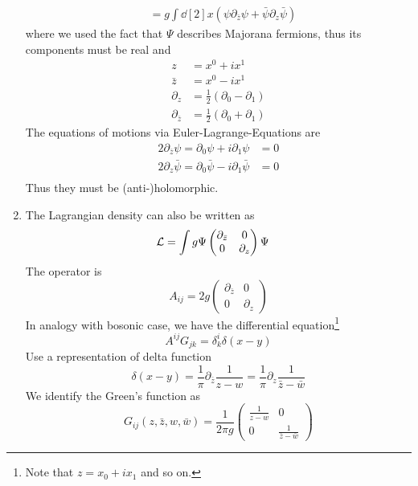 \begin{enumerate}[label=(\alph*)]
\begin{align*}
				 &= g \int \dd[2]{x} \left( {\psi} \partial_{\bar{z}} \psi + \bar{\psi} \partial_z \bar{\psi} \right)
		\end{align*}
		where we used the fact that $\Psi$ describes Majorana fermions, thus its components must be real and
		\begin{align*}
			z &= x^0+ix^1 \\
			\bar{z} &= x^0 - ix^1  \\
			\partial_z &= \frac{1}{2} \left( \partial_0 - \partial_1 \right) \\
			\partial_{\bar{z}} &= \frac{1}{2} \left( \partial_0 + \partial_1 \right)
		\end{align*}
		The equations of motions via Euler-Lagrange-Equations are
		\begin{align*}
			2\partial_{\bar{z}} \psi = \partial_0\psi + i \partial_1 \psi &=0	 \\
			2\partial_{z} \bar\psi = \partial_0 \bar\psi - i \partial_1 \bar\psi &=0	 \\
		\end{align*}
		Thus they must be (anti-)holomorphic.

	\item The Lagrangian density can also be written as
		\begin{align*}
			\mathcal{L} &= \int  g \Psi \begin{pmatrix} \partial_{\bar{z}} & 0  \\ 0 & \partial_{z}  \end{pmatrix} \Psi 
		\end{align*}
		The operator is
		\begin{equation}
			A_{ij} = 2g \begin{pmatrix} \partial_{\bar{z}} & 0 \\ 0 & \partial_z \end{pmatrix} 
		\end{equation}
		In analogy with bosonic case, we have the differential equation\footnote{Note that $z=x_0 + ix_1$ and so on.}
		\begin{equation}
			A^{ij} G_{jk} = \delta^{i}_{k} \delta(x-y)
		\end{equation}
		Use a representation of delta function
		\begin{equation*}
			\delta(x-y) = \frac{1}{\pi} \partial_{\bar{z}} \frac{1}{z-w} = \frac{1}{\pi} \partial_{z} \frac{1}{\bar{z}-\bar{w}}
		\end{equation*}
		We identify the Green's function as
		\begin{equation}
			G_{ij}(z,\bar{z},w,\bar{w}) = \frac{1}{2\pi g} \begin{pmatrix} \frac{1}{z-w} & 0 \\ 0 & \frac{1}{\bar{z}-\bar{w}} \end{pmatrix}
		\end{equation}
\end{enumerate}
